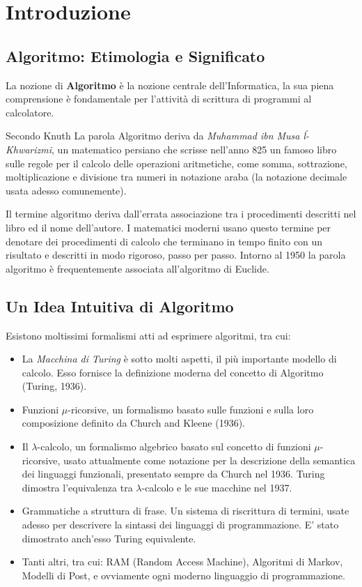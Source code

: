 
\chapter{Introduzione}

\section{Algoritmo: Etimologia e Significato}

La nozione di \textbf{Algoritmo} è la nozione centrale dell'Informatica, la sua piena comprensione è fondamentale per l'attività di scrittura di programmi al calcolatore.

Secondo Knuth \cite{knuth} La parola Algoritmo deriva da \emph{Muhammad ibn Musa \'l-Khwarizmi}, un matematico persiano che scrisse nell'anno 825 un famoso libro sulle regole per il calcolo delle operazioni aritmetiche, come somma, sottrazione, moltiplicazione e divisione tra numeri in notazione araba (la notazione decimale usata adesso comunemente).

Il termine algoritmo deriva dall'errata associazione tra i procedimenti descritti nel libro ed il nome dell'autore. I matematici moderni usano questo termine per denotare dei procedimenti di calcolo che terminano in tempo finito con un risultato e descritti in modo rigoroso, passo per passo. Intorno al 1950 la parola algoritmo è frequentemente associata all'algoritmo di Euclide. 

\section{Un Idea Intuitiva di Algoritmo}

Esistono moltissimi formalismi atti ad esprimere algoritmi, tra cui:
\begin{itemize}
 \item La \emph{Macchina di Turing} è sotto molti aspetti, il più importante modello di calcolo. Esso fornisce la 
  definizione moderna del concetto di Algoritmo (Turing, 1936).
 \item Funzioni $\mu$-ricorsive, un formalismo basato sulle funzioni e sulla loro composizione definito da Church and Kleene (1936).
 \item Il $\lambda$-calcolo, un formalismo algebrico basato sul concetto di funzioni $\mu$-ricorsive, usato
 attualmente come notazione per la descrizione della semantica dei linguaggi funzionali, presentato
 sempre da Church nel 1936. Turing dimostra l'equivalenza tra $\lambda$-calcolo e le sue macchine
 nel 1937.
 \item Grammatiche a struttura di frase. Un sistema di riscrittura di termini, usate adesso per descrivere la sintassi dei linguaggi di programmazione. E' stato dimostrato anch'esso Turing equivalente.
 \item Tanti altri, tra cui: RAM (Random Access Machine), Algoritmi di Markov, Modelli di Post, e ovviamente ogni moderno linguaggio di programmazione.
\end{itemize}

